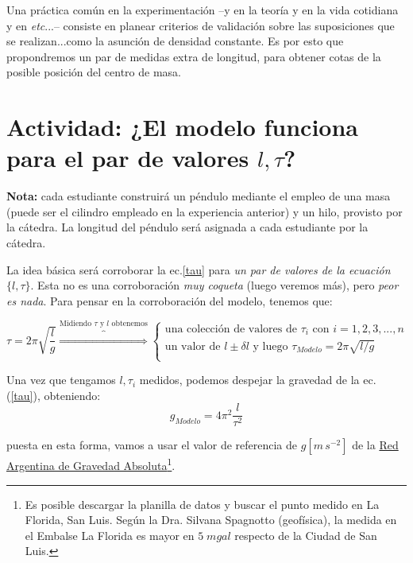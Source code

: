 \documentclass[10pt,a4paper]{article}
\numberwithin{equation}{section}%
\numberwithin{equation}{subsection}
\begin{document}
Una práctica común en la experimentación --y en la teoría y en la vida cotidiana y en \textit{etc}...-- consiste en planear criterios de validación sobre las suposiciones que se realizan...como la asunción de densidad constante. Es por esto que propondremos un par de medidas extra de longitud, para obtener cotas de la posible posición del centro de masa.

\section{Actividad: ¿El modelo funciona para el par de valores ${l, \tau}$?}


\noindent \begin{footnotesize} \textbf{Nota:} cada estudiante construirá un péndulo mediante el empleo de una masa (puede ser el cilindro empleado en la experiencia anterior) y un hilo, provisto por la cátedra. La longitud del péndulo será asignada a cada estudiante por la cátedra.\end{footnotesize}



La idea básica será corroborar la ec.\eqref{tau} para \textit{un par de valores de la ecuación} $\{l,\tau\}$. Esta no es una corroboración \textit{muy coqueta} (luego veremos más), pero \textit{peor es nada}. Para pensar en la corroboración del modelo, tenemos que:

\begin{equation}
\tau = 2\pi \sqrt{\frac{l}{g}} \overbrace{\quad \Longrightarrow \quad}^{\text{Midiendo } \tau \text{ y } l \text{ obtenemos}}
\begin{cases}
\text{una colección de valores de } \tau_i \text{ con } i = 1,2,3,...,n\\
\text{un valor de } l \pm \delta l \text{ y luego } \tau_{Modelo} = 2 \pi \sqrt{l/g}\\
\end{cases}
\end{equation}


Una vez que tengamos ${l, \tau_i}$ medidos, podemos despejar la gravedad de la ec.(\eqref{tau}), obteniendo: 
\begin{equation}\label{etaumodelo}
g_{Modelo} = 4 \pi^2 \frac{l}{\tau^2}
\end{equation}

\noindent puesta en esta forma, vamos a usar el valor de referencia de $g [m \, s^{-2}]$ de la \href{https://www.ign.gob.ar/NuestrasActividades/Geodesia/Gravimetria/RAGA}{Red Argentina de Gravedad Absoluta}\footnote{Es posible descargar la planilla de datos y buscar el punto medido en La Florida, San Luis. Según la Dra. Silvana Spagnotto (geofísica), la medida en el Embalse La Florida es mayor en $5  \; mgal$ respecto de la Ciudad de San Luis.}.
\end{document}
